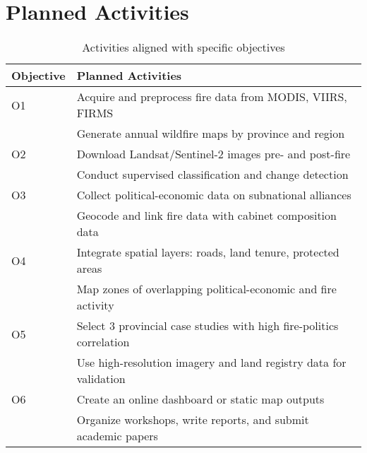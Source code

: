\section{Planned Activities}

\begin{table}[h!]
\centering
\begin{tabular}{@{}ll@{}}
\toprule
\textbf{Objective} & \textbf{Planned Activities} \\
\midrule
O1 & Acquire and preprocess fire data from MODIS, VIIRS, FIRMS \\
   & Generate annual wildfire maps by province and region \\
\addlinespace
O2 & Download Landsat/Sentinel-2 images pre- and post-fire \\
   & Conduct supervised classification and change detection \\
\addlinespace
O3 & Collect political-economic data on subnational alliances \\
   & Geocode and link fire data with cabinet composition data \\
\addlinespace
O4 & Integrate spatial layers: roads, land tenure, protected areas \\
   & Map zones of overlapping political-economic and fire activity \\
\addlinespace
O5 & Select 3 provincial case studies with high fire-politics correlation \\
   & Use high-resolution imagery and land registry data for validation \\
\addlinespace
O6 & Create an online dashboard or static map outputs \\
   & Organize workshops, write reports, and submit academic papers \\
\bottomrule
\end{tabular}
\caption{Activities aligned with specific objectives}
\end{table}